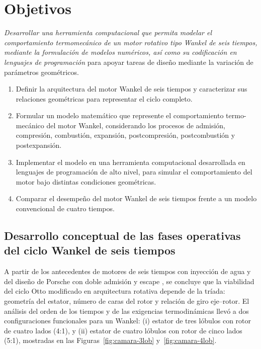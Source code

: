 \documentclass{LS}
\begin{document}
\section{\bfseries\fontsize{10}{12}\selectfont Objetivos }\label{sec:intro}

\textit{Desarrollar una herramienta computacional que permita modelar el comportamiento termomecánico de un motor rotativo tipo Wankel de seis tiempos, mediante la formulación de modelos numéricos, así como su codificación en lenguajes de programación} para apoyar tareas de diseño mediante la variación de parámetros geométricos.

\begin{enumerate}
    \item Definir la arquitectura del motor Wankel de seis tiempos y caracterizar sus relaciones geométricas para representar el ciclo completo.

    \item Formular un modelo matemático que represente el comportamiento termo-mecánico del motor Wankel, considerando los procesos de admisión, compresión, combustión, expansión, postcompresión, postcombustión y postexpansión.

    \item Implementar el modelo en una herramienta computacional desarrollada en lenguajes de programación de alto nivel, para simular el comportamiento del motor bajo distintas condiciones geométricas.

    \item Comparar el desempeño del motor Wankel de seis tiempos frente a un modelo convencional de cuatro tiempos.
\end{enumerate}


\subsection{Desarrollo conceptual de las fases operativas del ciclo Wankel de seis tiempos}

A partir de los antecedentes de motores de seis tiempos con inyección de agua \cite{bajulaz1989} y del diseño de Porsche con doble admisión y escape \cite{porsche2024}, se concluye que la viabilidad del ciclo Otto modificado en arquitectura rotativa depende de la tríada: geometría del estator, número de caras del rotor y relación de giro eje–rotor. El análisis del orden de los tiempos y de las exigencias termodinámicas llevó a dos configuraciones funcionales para un Wankel: (i) estator de tres lóbulos con rotor de cuatro lados (4:1), y (ii) estator de cuatro lóbulos con rotor de cinco lados (5:1), mostradas en las Figuras~\ref{fig:camara-3lob} y~\ref{fig:camara-4lob}.
\end{document}
